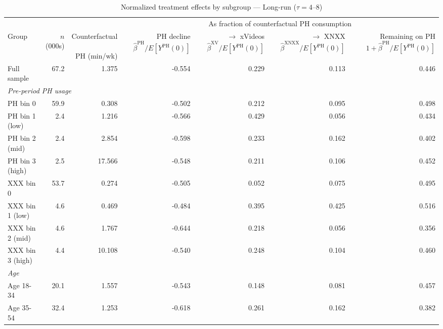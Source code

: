 \begin{landscape}
\begin{table}[htbp]
\centering
\caption{Normalized treatment effects by subgroup --- Long-run ($\tau = 4$--$8$)}
\label{tab:normalized_het_lt}
\begin{tabular}{lrr rrrr}
\toprule
& & & \multicolumn{4}{c}{As fraction of counterfactual PH consumption} \\
\cmidrule(lr){4-7}
Group & $n$ (000s) & \shortstack{Counterfactual \\\\ PH (min/wk)} & \shortstack{PH decline \\\\ $\hat{\beta}^{\text{PH}}/E[Y^{\text{PH}}(0)]$} & \shortstack{$\to$ xVideos \\\\ $\hat{\beta}^{\text{XV}}/E[Y^{\text{PH}}(0)]$} & \shortstack{$\to$ XNXX \\\\ $\hat{\beta}^{\text{XNXX}}/E[Y^{\text{PH}}(0)]$} & \shortstack{Remaining on PH \\\\ $1 + \hat{\beta}^{\text{PH}}/E[Y^{\text{PH}}(0)]$}
\\ \midrule
Full sample & 67.2 & 1.375 & -0.554 & 0.229 & 0.113 & 0.446 \\
\midrule
\multicolumn{7}{l}{\textit{Pre-period PH usage}} \\
PH bin 0 & 59.9 & 0.308 & -0.502 & 0.212 & 0.095 & 0.498 \\
PH bin 1 (low) & 2.4 & 1.216 & -0.566 & 0.429 & 0.056 & 0.434 \\
PH bin 2 (mid) & 2.4 & 2.854 & -0.598 & 0.233 & 0.162 & 0.402 \\
PH bin 3 (high) & 2.5 & 17.566 & -0.548 & 0.211 & 0.106 & 0.452 \\
XXX bin 0 & 53.7 & 0.274 & -0.505 & 0.052 & 0.075 & 0.495 \\
XXX bin 1 (low) & 4.6 & 0.469 & -0.484 & 0.395 & 0.425 & 0.516 \\
XXX bin 2 (mid) & 4.6 & 1.767 & -0.644 & 0.218 & 0.056 & 0.356 \\
XXX bin 3 (high) & 4.4 & 10.108 & -0.540 & 0.248 & 0.104 & 0.460 \\
\midrule
\multicolumn{7}{l}{\textit{Age}} \\
Age 18-34 & 20.1 & 1.557 & -0.543 & 0.148 & 0.081 & 0.457 \\
Age 35-54 & 32.4 & 1.253 & -0.618 & 0.261 & 0.162 & 0.382 \\

\end{tabular}
\end{table}
\end{landscape}
